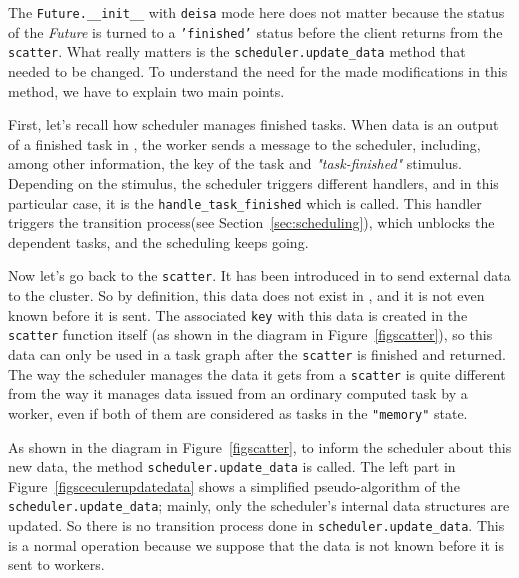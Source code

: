 The \texttt{Future.\_\_init\_\_} with \texttt{deisa} mode here does not matter because the status of the \textit{Future} is turned to a \texttt{'finished'} status before the client returns from the \texttt{scatter}.
What really matters is the \texttt{scheduler.update\_data} method that needed to be changed. To understand the need for the made modifications in this method, we have to explain two main points.

First, let's recall how \dask scheduler manages finished tasks. When data is an output of a finished task in \dask, the worker sends a message to the scheduler, including, among other information, the key of the task and \textit{"task-finished"} stimulus. Depending on the stimulus, the scheduler triggers different handlers, and in this particular case, it is the \texttt{handle\_task\_finished} which is called. 
This handler triggers the transition process(see Section~\ref{sec:scheduling}), which unblocks the dependent tasks, and the scheduling keeps going.

Now let's go back to the \texttt{scatter}. It has been introduced in \dask to send external data to the cluster. So by definition, this data does not exist in \dask, and it is not even known before it is sent. The associated \texttt{key} with this data is created in the \texttt{scatter} function itself (as shown in the diagram in Figure~\ref{figscatter}), so this data can only be used in a task graph after the \texttt{scatter} is finished and returned.
The way the scheduler manages the data it gets from a \texttt{scatter} is quite different from the way it manages data issued from an ordinary computed task by a worker, even if both of them are considered as tasks in the \texttt{"memory"} state.

As shown in the diagram in Figure~\ref{figscatter}, to inform the scheduler about this new data, the method \texttt{scheduler.update\_data} is called. The left part in Figure~\ref{figsceculerupdatedata} shows a simplified pseudo-algorithm of the \texttt{scheduler.update\_data}; mainly, only the scheduler's internal data structures are updated. So there is no transition process done in \texttt{scheduler.update\_data}. This is a normal operation because we suppose that the data is not known before it is sent to \dask workers. 

